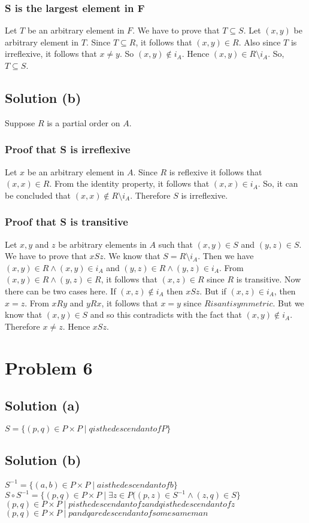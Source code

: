 \documentclass{article}
\begin{document}
\subsubsection{S is the largest element in F}
Let $T$ be an arbitrary element in $F$. We have to prove that $T
\subseteq S$. Let $(x,y)$ be arbitrary element in $T$. Since $T
\subseteq R$, it follows that $(x,y) \in R$. Also since $T$ is
irreflexive, it follows that $x \neq y$. So $(x,y) \notin i_A$. Hence
$(x,y) \in R \setminus i_A$. So, $T \subseteq S$.

\subsection{Solution (b)}
Suppose $R$ is a partial order on $A$.
\subsubsection{Proof that S is irreflexive}
Let $x$ be an arbitrary element in $A$. Since $R$ is reflexive it
follows that $(x,x) \in R$. From the identity property, it follows
that $(x,x) \in i_A$. So, it can be concluded that $(x,x) \notin R
\setminus i_A$. Therefore $S$ is irreflexive.
\subsubsection{Proof that S is transitive}
Let $x,y$ and $z$ be arbitrary elements in $A$ such that $(x,y) \in S$
and $(y,z) \in S$. We have to prove that $xSz$. We know that
$S = R \setminus i_A$. Then we have $(x,y) \in R \land (x,y) \in i_A$
and $(y,z) \in R \land (y,z) \in i_A$. From
$(x,y) \in R \land (y,z) \in R$, it follows that $(x,z) \in R$ since
$R$ is transitive. Now there can be two cases here. If
$(x,z) \notin i_A$ then $xSz$. But if $(x,z) \in i_A$, then $x = z$.
From $xRy$ and $yRx$, it follows that $x = y$ since
$R is antisymmetric$. But we know that $(x,y) \in S$ and so this
contradicts with the fact that $(x,y) \notin i_A$. Therefore $x \neq
z$. Hence $xSz$.

\section{Problem 6}
\subsection{Solution (a)}
$S = \{(p,q) \in P \times P \mid q is the descendant of P \}$
\subsection{Solution (b)}
$S^{-1} = \{(a,b) \in P \times P \mid a is the descendant of b\}$
$S \circ S^{-1} = \{(p,q) \in P \times P \mid \exists z \in P((p,z)
\in S^{-1} \land (z,q) \in S\}$ \\
${(p,q) \in P \times P \mid p is the descendant of z and q is the
  descendant of z}$ \\
${(p,q) \in P \times P \mid p and q are descendant of some same man}$
\end{document}

